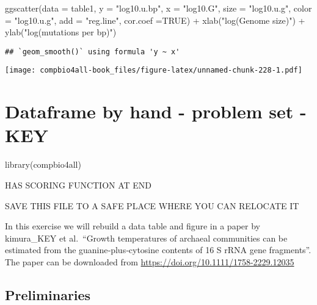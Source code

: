 \documentclass[
]{book}
\newenvironment{Shaded}{\begin{snugshade}}{\end{snugshade}}
\newcommand{\AttributeTok}[1]{\textcolor[rgb]{0.77,0.63,0.00}{#1}}
\newcommand{\ConstantTok}[1]{\textcolor[rgb]{0.00,0.00,0.00}{#1}}
\newcommand{\FunctionTok}[1]{\textcolor[rgb]{0.00,0.00,0.00}{#1}}
\newcommand{\NormalTok}[1]{#1}
\newcommand{\SpecialCharTok}[1]{\textcolor[rgb]{0.00,0.00,0.00}{#1}}
\newcommand{\StringTok}[1]{\textcolor[rgb]{0.31,0.60,0.02}{#1}}
\begin{document}
\begin{Shaded}
\begin{Highlighting}[]
\FunctionTok{ggscatter}\NormalTok{(}\AttributeTok{data =}\NormalTok{ table1,}
          \AttributeTok{y =} \StringTok{"log10.u.bp"}\NormalTok{,}
          \AttributeTok{x =} \StringTok{"log10.G"}\NormalTok{,}
          \AttributeTok{size =} \StringTok{"log10.u.g"}\NormalTok{,   }
          \AttributeTok{color =} \StringTok{"log10.u.g"}\NormalTok{,}
          \AttributeTok{add =} \StringTok{"reg.line"}\NormalTok{,}
          \AttributeTok{cor.coef =}\ConstantTok{TRUE}\NormalTok{) }\SpecialCharTok{+}
  \FunctionTok{xlab}\NormalTok{(}\StringTok{"log(Genome size)"}\NormalTok{)     }\SpecialCharTok{+}
  \FunctionTok{ylab}\NormalTok{(}\StringTok{"log(mutations per bp)"}\NormalTok{)}
\end{Highlighting}
\end{Shaded}

\begin{verbatim}
## `geom_smooth()` using formula 'y ~ x'
\end{verbatim}

\texttt{[image: compbio4all-book\_files/figure-latex/unnamed-chunk-228-1.pdf]}

\hypertarget{dataframe-by-hand---problem-set---key}{%
\chapter{Dataframe by hand - problem set - KEY}\label{dataframe-by-hand---problem-set---key}}

\begin{Shaded}
\begin{Highlighting}[]
\FunctionTok{library}\NormalTok{(compbio4all)}
\end{Highlighting}
\end{Shaded}

HAS SCORING FUNCTION AT END

SAVE THIS FILE TO A SAFE PLACE WHERE YOU CAN RELOCATE IT

In this exercise we will rebuild a data table and figure in a paper by kimura\_KEY et al.~``Growth temperatures of archaeal communities can be estimated from the guanine‐plus‐cytosine contents of 16 S rRNA gene fragments''. The paper can be downloaded from \url{https://doi.org/10.1111/1758-2229.12035}

\hypertarget{preliminaries-1}{%
\section{Preliminaries}\label{preliminaries-1}}
\end{document}
